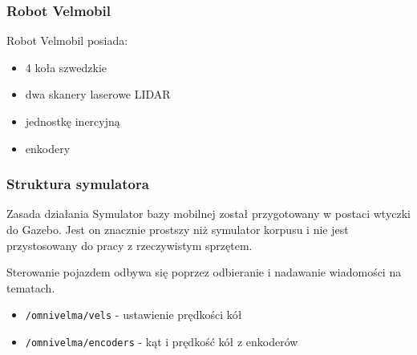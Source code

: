 
\begin{frame}
\frametitle{Robot Velmobil}
Robot Velmobil posiada:  
\begin{itemize}
	\item 4 koła szwedzkie
	\item dwa skanery laserowe LIDAR
	\item jednostkę inercyjną
	\item enkodery %
\end{itemize}
\end{frame}


\begin{frame}
\frametitle{Struktura symulatora}
\begin{block}{Zasada działania}
Symulator bazy mobilnej został przygotowany w postaci wtyczki do Gazebo. 
Jest on znacznie prostszy niż symulator korpusu i nie jest przystosowany
do pracy z rzeczywistym sprzętem.
\end{block}
\bigskip
Sterowanie pojazdem
odbywa się poprzez odbieranie i nadawanie wiadomości na tematach.
\begin{itemize}
	\item \texttt{/omnivelma/vels} - ustawienie prędkości kół
	\item \texttt{/omnivelma/encoders} - kąt i prędkość kół z enkoderów
\end{itemize}
\end{frame}